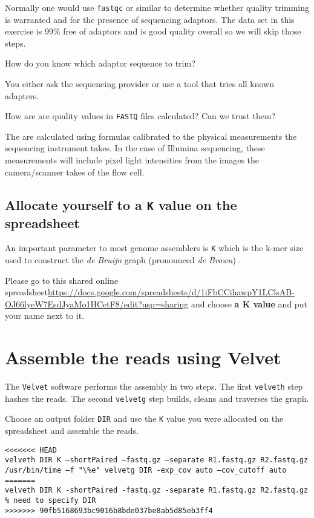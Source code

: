 Normally one would use \texttt{fastqc} or similar to determine whether
quality trimming is warranted and for the presence of sequencing adaptors.
The data set in this exercise is 99\% free of adaptors and is good quality
overall so we will skip those steps.
\begin{questions}
How do you know which adaptor sequence to trim? \\
\begin{answer}
You either ask the sequencing provider or use a tool that tries all known adapters.
\end{answer}
How are are quality values in \texttt{FASTQ} files calculated? Can we trust them? \\
\begin{answer}
The are calculated using formulas calibrated to the physical measurements the
sequencing instrument takes. In the case of Illumina sequencing, these measurements
will include pixel light intensities from the images the camera/scanner takes
of the flow cell.
\end{answer}
\end{questions}

\subsection{Allocate yourself to a \texttt{K} value on the spreadsheet}

An important parameter to most genome assemblers is \texttt{K} which is the
k-mer size used to construct the \textit{de Bruijn} graph (pronounced \textit{de Brown}) .

Please go to this shared online spreadsheet\url{https://docs.google.com/spreadsheets/d/1iFbCCihawpY1LClsAB-OJ66lyeW7EsdJyaMo1HCetF8/edit?usp=sharing}
and choose \textbf{a K value} and put your name next to it.

\section{Assemble the reads using Velvet}
The \texttt{Velvet} software performs the assembly in two steps. The first \texttt{velveth}
step hashes the reads. The second \texttt{velvetg} step builds, cleans and traverses the graph.

\begin{steps}
Choose an output folder \texttt{DIR} and use the \texttt{K} value you were allocated
on the spreadsheet and assemble the reads.
\begin{lstlisting}
<<<<<<< HEAD
velveth DIR K –shortPaired –fastq.gz –separate R1.fastq.gz R2.fastq.gz
/usr/bin/time –f "\%e" velvetg DIR -exp_cov auto –cov_cutoff auto
=======
velveth DIR K -shortPaired -fastq.gz -separate R1.fastq.gz R2.fastq.gz % need to specify DIR
>>>>>>> 90fb5168693bc9016b8bde037be8ab5d85eb3ff4
\end{lstlisting}
\end{steps}

